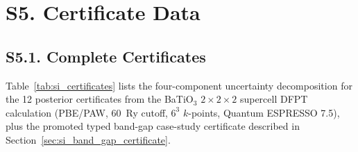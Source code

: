 \documentclass[onecolumn,superscriptaddress,amsmath,amssymb,longbibliography]{revtex4-2}
\begin{document}
\section{S5. Certificate Data}
\label{sec:si_certs}

\subsection{S5.1. Complete Certificates}

Table~\ref{tab:si_certificates} lists the four-component uncertainty
decomposition for the 12 posterior certificates from the BaTiO$_3$
$2\times2\times2$ supercell DFPT calculation (PBE/PAW, 60~Ry cutoff,
$6^3$ $k$-points, Quantum ESPRESSO 7.5), plus the promoted typed band-gap
case-study certificate described in Section~\ref{sec:si_band_gap_certificate}.
\end{document}

